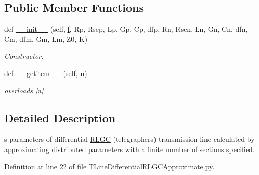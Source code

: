 \subsection*{Public Member Functions}
\begin{DoxyCompactItemize}
\item 
def \hyperlink{classSignalIntegrity_1_1SParameters_1_1Devices_1_1TLineDifferentialRLGCApproximate_1_1TLineDifferentialRLGCApproximate_a58e1768a4b29f316e37bd98032fbf748}{\+\_\+\+\_\+init\+\_\+\+\_\+} (self, \hyperlink{classSignalIntegrity_1_1SParameters_1_1SParameters_1_1SParameters_a32e7a34d6837fe949b413c852a0447f8}{f}, Rp, Rsep, Lp, Gp, Cp, dfp, Rn, Rsen, Ln, Gn, Cn, dfn, Cm, dfm, Gm, Lm, Z0, K)
\begin{DoxyCompactList}\small\item\em Constructor. \end{DoxyCompactList}\item 
def \hyperlink{classSignalIntegrity_1_1SParameters_1_1Devices_1_1TLineDifferentialRLGCApproximate_1_1TLineDifferentialRLGCApproximate_ab7a6da5139e0878b590d68292aaa70f2}{\+\_\+\+\_\+getitem\+\_\+\+\_\+} (self, n)
\begin{DoxyCompactList}\small\item\em overloads \mbox{[}n\mbox{]} \end{DoxyCompactList}\end{DoxyCompactItemize}


\subsection{Detailed Description}
s-\/parameters of differential \hyperlink{namespaceSignalIntegrity_1_1SParameters_1_1RLGC}{R\+L\+GC} (telegrapher\textquotesingle{}s) transmission line calculated by approximating distributed parameters with a finite number of sections specified. 



Definition at line 22 of file T\+Line\+Differential\+R\+L\+G\+C\+Approximate.\+py.



